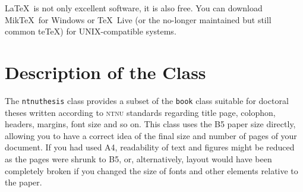 \documentclass[a4paper,10pt]{article}
\begin{document}
\LaTeX\ is not only excellent software, it is also free. You can download Mik\TeX\ for Windows or \TeX\ Live (or the no-longer maintained but still common te\TeX) for UNIX-compatible systems.

\section*{Description of the Class}
The \texttt{ntnuthesis} class provides a subset of the \texttt{book} class suitable for doctoral theses written according to \textsc{ntnu} standards regarding title page, colophon, headers, margins, font size and so on.
This class uses the B5 paper size directly, allowing you to have a correct idea of the final size and number of pages of your document. If you had used A4, readability of text and figures might be reduced as the pages were shrunk to B5, or, alternatively, layout would have been completely broken if you changed the size of fonts and other elements relative to the paper.
\end{document}
